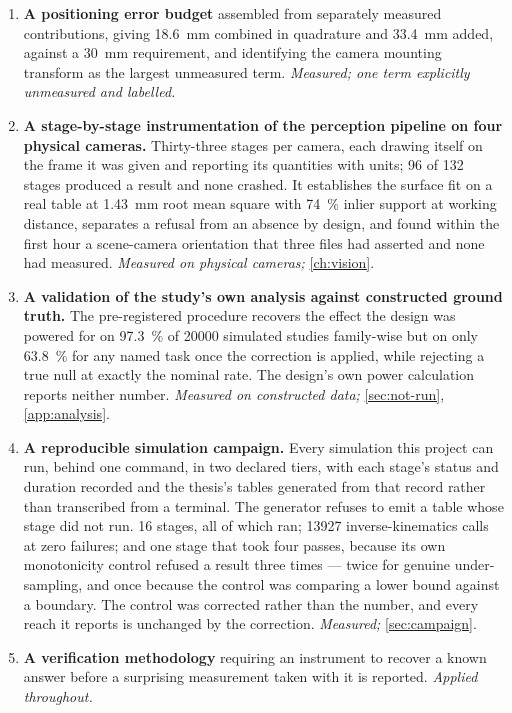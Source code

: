 \begin{enumerate}
  \item \textbf{A positioning error budget} assembled from separately measured
    contributions, giving \SI{18.6}{\milli\metre} combined in quadrature and
    \SI{33.4}{\milli\metre} added, against a \SI{30}{\milli\metre}
    requirement, and identifying the camera mounting transform as the largest
    unmeasured term. \emph{Measured; one term explicitly unmeasured and
    labelled.}

  \item \textbf{A stage-by-stage instrumentation of the perception pipeline
    on four physical cameras.} Thirty-three stages per camera, each drawing
    itself on the frame it was given and reporting its quantities with units;
    \num{96} of \num{132} stages produced a result and none crashed. It
    establishes the surface fit on a real table at \SI{1.43}{\milli\metre}
    root mean square with \SI{74}{\percent} inlier support at working
    distance, separates a refusal from an absence by design, and found within
    the first hour a scene-camera orientation that three files had asserted
    and none had measured. \emph{Measured on physical cameras;}
    \cref{ch:vision}.

  \item \textbf{A validation of the study's own analysis against constructed
    ground truth.} The pre-registered procedure recovers the effect the design
    was powered for on \SI{97.3}{\percent} of \num{20000} simulated studies
    family-wise but on only \SI{63.8}{\percent} for any named task once the
    correction is applied, while rejecting a true null at exactly the nominal
    rate. The design's own power calculation reports neither number.
    \emph{Measured on constructed data;} \cref{sec:not-run},
    \cref{app:analysis}.

  \item \textbf{A reproducible simulation campaign.} Every simulation this
    project can run, behind one command, in two declared tiers, with each
    stage's status and duration recorded and the thesis's tables generated
    from that record rather than transcribed from a terminal. The generator
    refuses to emit a table whose stage did not run. \num{16} stages, all of
    which ran; \num{13927} inverse-kinematics calls at zero failures; and one
    stage that took four passes, because its own monotonicity control refused
    a result three times --- twice for genuine under-sampling, and once
    because the control was comparing a lower bound against a boundary. The
    control was corrected rather than the number, and every reach it reports
    is unchanged by the correction. \emph{Measured;} \cref{sec:campaign}.

  \item \textbf{A verification methodology} requiring an instrument to recover
    a known answer before a surprising measurement taken with it is reported.
    \emph{Applied throughout.}
\end{enumerate}

